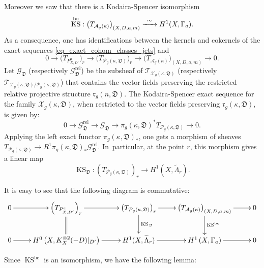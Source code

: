 \documentclass[10pt]{amsart}
\newcommand\To[1]{\mathchoice{\xrightarrow{\textstyle\kern4pt#1\kern3pt}}{\stackrel{#1}{\longrightarrow}}{}{}}
\newcommand{\BC}{\mathrm{bc}}
\newcommand{\rel}{\mathrm{rel}}
\DeclareMathOperator{\KS}{KS}
\theoremstyle{definition}
\theoremstyle{plain}
\begin{document}
Moreover we saw that there is a Kodaira-Spencer isomorphism
\[
\KS^{\BC}: \left(T_{\mathcal A_g(\kappa)}\right)_{(X, D, a, m)} \To{\sim} H^1(X, \Gamma_a).
\]
As a consequence, one has identifications between the kernels and cokernels of the exact sequences \eqref{eq_exact_cohom_classes_jets} and
\begin{equation*}
0 \to \bigl(T_{P_{X, D'}^a}\bigr)_r \to \bigl(T_{\mathcal P_g(\kappa, \mathfrak D)}\bigr)_r \to \bigl(T_{\mathcal A_g(\kappa)}\bigr)_{(X, D, a, m)} \to 0.
\end{equation*}
Let $\mathcal G_{\mathfrak D}$ (respectively $\mathcal G_{\mathfrak D}^{\rel}$) be the subsheaf of $\mathcal T_{\mathcal X_g(\kappa, \mathfrak D)}$ (respectively $\mathcal T_{\mathcal X_g(\kappa, \mathfrak D)/\mathcal P_g(\kappa, \mathfrak D)}$) that contains the vector fields preserving the restricted relative projective structure $\mathfrak r_g(n, \mathfrak D)$.
The Kodaira-Spencer exact sequence for the family $\mathcal X_g(\kappa, \mathfrak D)$, when restricted to the vector fields preserving $\mathfrak r_g(\kappa, \mathfrak D)$, is given by:
\begin{equation*}
0 \to \mathcal G_{\mathfrak D}^{\rel} \to \mathcal G_{\mathfrak D} \to \pi_g(\kappa, \mathfrak D)^* T_{\mathcal P_g(\kappa, \mathfrak D)} \to 0.
\end{equation*}
Applying the left exact functor $\pi_g(\kappa, \mathfrak D)_*$, one gets a morphism of sheaves $T_{\mathcal P_g(\kappa, \mathfrak D)} \to R^1 \pi_g(\kappa, \mathfrak D)_* \mathcal G_{\mathfrak D}^{\rel}$. In~particular, at the point $r$, this morphism gives a linear map
\begin{equation}\label{eq_kodaira_spencer_D}
\KS_{\mathfrak D}: \left(T_{\mathcal P_g(\kappa, \mathfrak D)}\right)_r \to H^1(X, \widetilde \Lambda_r).
\end{equation}

It is easy to see that the following diagram is commutative:
\begin{equation*}
\xymatrix{
0 \ar[r] &\left(T_{P_{X, D'}^a}\right)_r \ar@{=}[d] \ar[r] & \left(T_{\mathcal P_g(\kappa, \mathfrak D)}\right)_r \ar[d]^{\KS_{\mathfrak D}} \ar[r] & \left(T_{\mathcal A_g(\kappa)}\right)_{(X, D, a, m)} \ar[d]^{\KS^{\BC}} \ar[r] & 0 \\ 0 \ar[r] & H^0\left(X, K_X^{\otimes 2}(-D)|_{D'}\right) \ar [r] & H^1(X, \widetilde \Lambda_r) \ar[r] & H^1\left(X, \Gamma_a\right) \ar[r]& 0
}
\end{equation*}

Since $\KS^{\BC}$ is an isomorphism, we have the following lemma:
\end{document}
